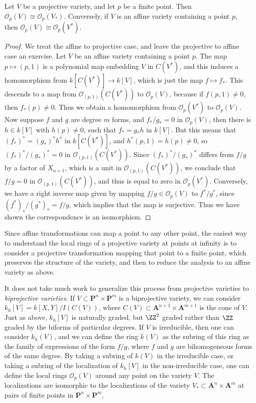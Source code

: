 \begin{theorem}
    Let $V$ be a projective variety, and let $p$ be a finite point. Then $\mathcal{O}_p(V) \cong \mathcal{O}_p(V_*)$. Conversely, if $V$ is an affine variety containing a point $p$, then $\mathcal{O}_p(V) \cong \mathcal{O}_p(V^*)$.
\end{theorem}
\begin{proof}
    We treat the affine to projective case, and leave the projective to affine case an exercise. Let $V$ be an affine variety containing a point $p$. The map $p \mapsto (p,1)$ is a polynomial map embedding $V$ in $C(V^*)$, and this induces a homomorphism from $k[C(V^*)] \to k[V]$, which is just the map $f \mapsto f_*$. This descends to a map from $\mathcal{O}_{(p,1)}(C(V^*))$ to $\mathcal{O}_p(V)$, because if $f(p,1) \neq 0$, then $f_*(p) \neq 0$. Thus we obtain a homomorphism from $\mathcal{O}_p(V^*)$ to $\mathcal{O}_p(V)$. Now suppose $f$ and $g$ are degree $m$ forms, and $f_*/g_* = 0$ in $\mathcal{O}_p(V)$, then there is $h \in k[V]$ with $h(p) \neq 0$, such that $f_* = g_* h$ in $k[V]$. But this means that $(f_*)^* = (g_*)^* h^*$ in $k[C(V^*)]$, and $h^*(p,1) = h(p) \neq 0$, so $(f_*)^*/(g_*)^* = 0$ in $\mathcal{O}_{(p,1)}(C(V^*))$. Since $(f_*)^*/(g_*)^*$ differs from $f/g$ by a factor of $X_{n+1}$, which is a unit in $\mathcal{O}_{(p,1)}(C(V^*))$, we conclude that $f/g = 0$ in $\mathcal{O}_{(p,1)}(C(V^*))$, and thus is equal to zero in $\mathcal{O}_p(V^*)$. Conversely, we have a right inverse map given by mapping $f/g \in \mathcal{O}_p(V)$ to $f^*/g^*$, since $(f^*)_*/(g^*)_* = f/g$, which implies that the map is surjective. Thus we have shown the correspondence is an isomorphism.
\end{proof}

Since affine transformations can map a point to any other point, the easiest way to understand the local rings of a projective variety at points at infinity is to consider a projective transformation mapping that point to a finite point, which preserves the structure of the variety, and then to reduce the analysis to an affine variety as above.

It does not take much work to generalize this process from projective varieties to \emph{biprojective varieties}. If $V \subset \mathbf{P}^n \times \mathbf{P}^m$ is a biprojective variety, we can consider $k_h[V] = k[X,Y]/I(C(V))$, where $C(V) \subset \mathbf{A}^{n+1} \times \mathbf{A}^{m+1}$ is the cone of $V$. Just as above, $k_h[V]$ is naturally graded, but $\ZZ^2$ graded rather than $\ZZ$ graded by the biforms of particular degrees. If $V$ is irreducible, then one can consider $k_h(V)$, and we can define the ring $k(V)$ as the subring of this ring as the family of expressions of the form $f/g$, where $f$ and $g$ are bihomogeneous forms of the same degree. By taking a subring of $k(V)$ in the irreducible case, or taking a subring of the localization of $k_h[V]$ in the non-irreducible case, one can define the local rings $\mathcal{O}_p(V)$ around any point on the variety $V$. The localizations are isomorphic to the localizations of the variety $V_* \subset \mathbf{A}^n \times \mathbf{A}^m$ at pairs of finite points in $\mathbf{P}^n \times \mathbf{P}^m$.

